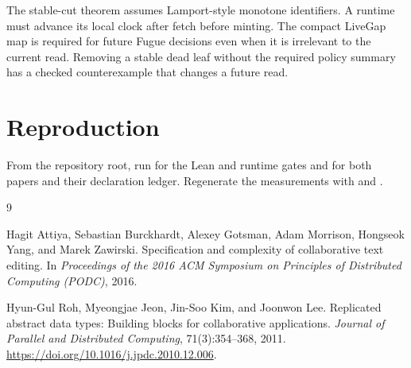 The stable-cut theorem assumes Lamport-style monotone identifiers. A runtime
must advance its local clock after fetch before minting. The compact LiveGap
map is required for future Fugue decisions even when it is irrelevant to the
current read. Removing a stable dead leaf without the required policy summary
has a checked counterexample that changes a future read.

\section{Reproduction}

From the repository root, run  for the
Lean and runtime gates and  for both
papers and their declaration ledger. Regenerate the measurements with
 and
.

\begin{thebibliography}{9}

Hagit Attiya, Sebastian Burckhardt, Alexey Gotsman, Adam Morrison, Hongseok
Yang, and Marek Zawirski.
\newblock Specification and complexity of collaborative text editing.
\newblock In \emph{Proceedings of the 2016 ACM Symposium on Principles of
Distributed Computing (PODC)}, 2016.

Hyun-Gul Roh, Myeongjae Jeon, Jin-Soo Kim, and Joonwon Lee.
\newblock Replicated abstract data types: Building blocks for collaborative
applications.
\newblock \emph{Journal of Parallel and Distributed Computing},
71(3):354--368, 2011.
\newblock \url{https://doi.org/10.1016/j.jpdc.2010.12.006}.

\end{thebibliography}



